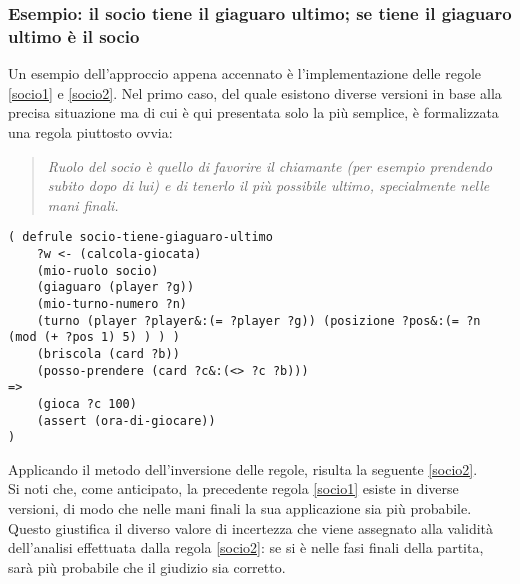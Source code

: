 
\subsubsection*{Esempio: il socio tiene il giaguaro ultimo; se tiene il giaguaro ultimo è il socio}
Un esempio dell'approccio appena accennato è l'implementazione delle regole \ref{socio1} e \ref{socio2}.
Nel primo caso, del quale esistono diverse versioni in base alla precisa situazione ma di cui è qui presentata solo la più semplice, è formalizzata una regola piuttosto ovvia:
\begin{quote}
\emph{Ruolo del socio è quello di favorire il chiamante (per esempio prendendo subito dopo di lui) e di tenerlo il più possibile ultimo, specialmente nelle mani finali.}
\end{quote}
\begin{lstlisting}[caption={Se sono il socio e gioco subito dopo di lui, se posso prendere senza palesarmi, prendo per lasciarlo ultimo la mano successiva},label=socio1]
( defrule socio-tiene-giaguaro-ultimo
    ?w <- (calcola-giocata)
    (mio-ruolo socio)
    (giaguaro (player ?g))
    (mio-turno-numero ?n)
    (turno (player ?player&:(= ?player ?g)) (posizione ?pos&:(= ?n (mod (+ ?pos 1) 5) ) ) )
    (briscola (card ?b))
    (posso-prendere (card ?c&:(<> ?c ?b)))
=>
    (gioca ?c 100)
    (assert (ora-di-giocare))
)
\end{lstlisting}
Applicando il metodo dell'inversione delle regole, risulta la seguente \ref{socio2}.\\
Si noti che, come anticipato, la precedente regola \ref{socio1} esiste in diverse versioni, di modo che nelle mani finali la sua applicazione sia più probabile. Questo giustifica il diverso valore di incertezza che viene assegnato alla validità dell'analisi effettuata dalla regola \ref{socio2}: se si è nelle fasi finali della partita, sarà più probabile che il giudizio sia corretto.



